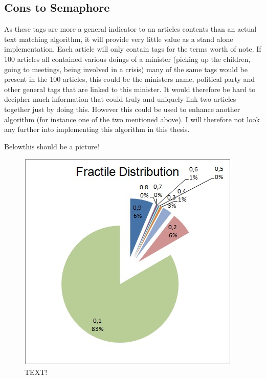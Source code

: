 \subsection{Cons to Semaphore}
As these tags are more a general indicator to an articles contents than an actual text matching algorithm, it will provide very little value as a stand alone implementation. Each article will only contain tags for the terms worth of note. If 100 articles all contained various doings of a minister (picking up the children, going to meetings, being involved in a crisis) many of the same tags would be present in the 100 articles, this could be the ministers name, political party and other general tags that are linked to this minister. It would therefore be hard to decipher much information that could truly and uniquely link two articles together just by doing this. However this could be used to enhance another algorithm (for instance one of the two mentioned above). I will therefore not look any further into implementing this algorithm in this thesis.

Belowthis should be a picture!
\begin{figure}[hb]
	\centering
	\includegraphics[scale=1.0]{figures/JV-Lemvig}
	\caption{TEXT!}
\end{figure}







